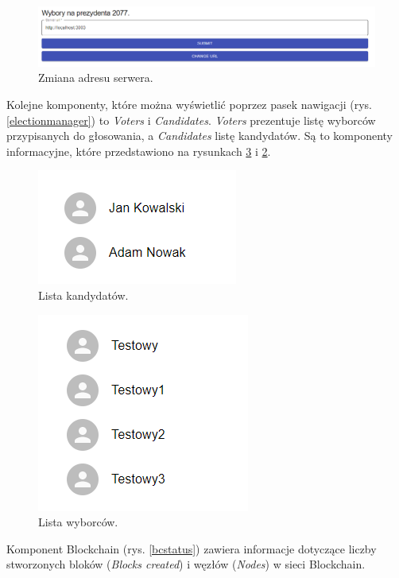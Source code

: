 \documentclass[a4paper,12pt]{book}
\begin{document}
\begin{figure}[H]
	\centering
	\includegraphics[width=\textwidth]{images/changeurl.png}
	\caption{Zmiana adresu serwera.}\label{changeurl}
\end {figure}

Kolejne komponenty, które można wyświetlić poprzez pasek nawigacji (rys. \ref{electionmanager}) to \textit{Voters} i \textit{Candidates}. \textit{Voters} prezentuje listę wyborców przypisanych do głosowania, a \textit{Candidates} listę kandydatów. Są to komponenty informacyjne, które przedstawiono na rysunkach \ref{infovoters} i \ref{infocandidates}.

\begin{figure}[H]
	\centering
	\includegraphics{images/infocandidates.png}
	\caption{Lista kandydatów.}\label{infocandidates}
\end {figure}

\begin{figure}[H]
	\centering
	\includegraphics{images/infovoters.png}
	\caption{Lista wyborców.}\label{infovoters}
\end {figure}

Komponent Blockchain (rys. \ref{bcstatus}) zawiera informacje dotyczące liczby stworzonych bloków (\textit{Blocks created}) i węzłów (\textit{Nodes}) w sieci Blockchain. 
\end{document}
